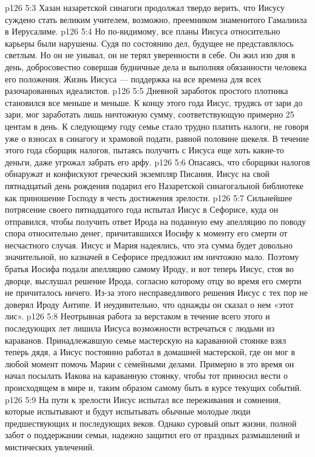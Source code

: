 \vs p126 5:3 Хазан назаретской синагоги продолжал твердо верить, что Иисусу суждено стать великим учителем, возможно, преемником знаменитого Гамалиила в Иерусалиме.
\vs p126 5:4 \pc Но по\hyp{}видимому, все планы Иисуса относительно карьеры были нарушены. Судя по состоянию дел, будущее не представлялось светлым. Но он не унывал, он не терял уверенности в себе. Он жил изо дня в день, добросовестно совершая будничные дела и выполняя  обязанности человека его положения. Жизнь Иисуса --- поддержка на все времена для всех разочарованных идеалистов.
\vs p126 5:5 Дневной заработок простого плотника становился все меньше и меньше. К концу этого года Иисус, трудясь от зари до зари, мог заработать лишь ничтожную сумму, соответствующую примерно 25 центам в день. К следующему году семье стало трудно платить налоги, не говоря уже о взносах в синагогу и храмовой подати, равной половине шекеля. В течение этого года сборщик налогов, пытаясь получить с Иисуса еще хоть какие\hyp{}то деньги, даже угрожал забрать его арфу.
\vs p126 5:6 Опасаясь, что сборщики налогов обнаружат и конфискуют греческий экземпляр Писания, Иисус на свой пятнадцатый день рождения подарил его Назаретской синагогальной библиотеке как приношение Господу в честь достижения зрелости.
\vs p126 5:7 \pc Сильнейшее потрясение своего пятнадцатого года испытал Иисус в Сефорисе, куда он отправился, чтобы получить ответ Ирода на поданную ему апелляцию по поводу спора относительно денег, причитавшихся Иосифу к моменту его смерти от несчастного случая. Иисус и Мария надеялись, что эта сумма будет довольно значительной, но казначей в Сефорисе предложил им ничтожно мало. Поэтому братья Иосифа подали апелляцию самому Ироду, и вот теперь Иисус, стоя во дворце, выслушал решение Ирода, согласно которому отцу во время его смерти не причиталось ничего. Из\hyp{}за этого несправедливого решения Иисус с тех пор не доверял Ироду Антипе. И неудивительно, что однажды он сказал о нем «этот лис».
\vs p126 5:8 Неотрывная работа за верстаком в течение всего этого и последующих лет лишила Иисуса возможности встречаться с людьми из караванов. Принадлежавшую семье мастерскую на караванной стоянке взял теперь дядя, а Иисус постоянно работал в домашней мастерской, где он мог в любой момент помочь Марии с семейными делами. Примерно в это время он начал посылать Иакова на караванную стоянку, чтобы тот приносил вести о происходящем в мире и, таким образом самому быть в курсе текущих событий.
\vs p126 5:9 На пути к зрелости Иисус испытал все переживания и сомнения, которые испытывают и будут испытывать обычные молодые люди предшествующих и последующих веков. Однако суровый опыт жизни, полной забот о поддержании семьи, надежно защитил его от праздных размышлений и мистических увлечений.
